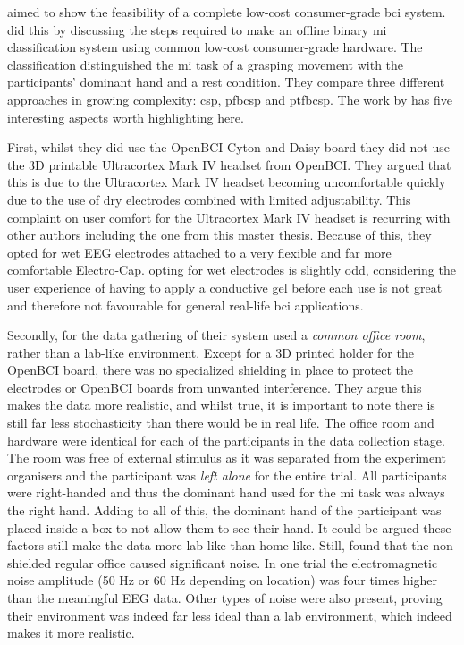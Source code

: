  aimed to show the feasibility of a complete low-cost consumer-grade \gls{bci} system.
 did this by discussing the steps required to make an offline binary \gls{mi} classification system using common low-cost consumer-grade hardware.
The classification distinguished the \gls{mi} task of a grasping movement with the participants' dominant hand and a rest condition.
They compare three different approaches in growing complexity: \gls{csp}, \gls{pfbcsp} and \gls{ptfbcsp}.
The work by \citet{cheap_bci_feasibility} has five interesting aspects worth highlighting here.

First, whilst they did use the OpenBCI Cyton and Daisy board they did not use the 3D printable Ultracortex Mark IV headset from OpenBCI.
They argued that this is due to the Ultracortex Mark IV headset becoming uncomfortable quickly due to the use of dry electrodes combined with limited adjustability.
This complaint on user comfort for the Ultracortex Mark IV headset is recurring with other authors including the one from this master thesis.
Because of this, they opted for wet EEG electrodes attached to a very flexible and far more comfortable Electro-Cap.
  opting for wet electrodes is slightly odd, considering the user experience of having to apply a conductive gel before each use is not great and therefore not favourable for general real-life \gls{bci} applications.

Secondly, for the data gathering of their system \citet{cheap_bci_feasibility} used a \textit{common office room}, rather than a lab-like environment.
Except for a 3D printed holder for the OpenBCI board, there was no specialized shielding in place to protect the electrodes or OpenBCI boards from unwanted interference.
They argue this makes the data more realistic, and whilst true, it is important to note there is still far less stochasticity than there would be in real life.
The office room and hardware were identical for each of the participants in the data collection stage.
The room was free of external stimulus as it was separated from the experiment organisers and the participant was \textit{left alone} for the entire trial.
All participants were right-handed and thus the dominant hand used for the \gls{mi} task was always the right hand.
Adding to all of this, the dominant hand of the participant was placed inside a box to not allow them to see their hand.
It could be argued these factors still make the data more lab-like than home-like.
Still, \citet{cheap_bci_feasibility} found that the non-shielded regular office caused significant noise.
In one trial the electromagnetic noise amplitude (50 Hz or 60 Hz depending on location) was four times higher than the meaningful EEG data.
Other types of noise were also present, proving their environment was indeed far less ideal than a lab environment, which indeed makes it more realistic.

